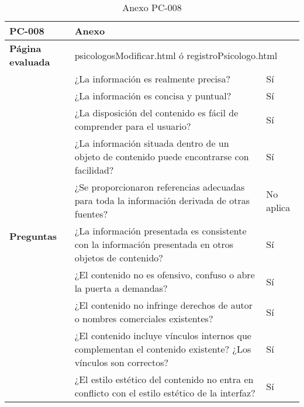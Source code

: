 \begin{table}[htpb]
\centering
\begin{tabularx}{\textwidth}{|l|X|l|}
\hline
\textbf{PC-008}                       & \multicolumn{2}{l|}{Anexo}                                                                                                \\ \hline
\textbf{Página evaluada}             & \multicolumn{2}{l|}{psicologosModificar.html ó registroPsicologo.html}                                    \\ \hline
\multirow{10}{*}{\textbf{Preguntas}} & ¿La información es realmente precisa?                                                                         & Sí        \\ \cline{2-3} 
                                     & ¿La información es concisa y puntual?                                                                         & Sí        \\ \cline{2-3} 
                                     & ¿La disposición del contenido es fácil de comprender para el usuario?                                         & Sí        \\ \cline{2-3} 
                                     & ¿La información situada dentro de un objeto de contenido puede encontrarse con facilidad?                     & Sí        \\ \cline{2-3} 
                                     & ¿Se proporcionaron referencias adecuadas para toda la información derivada de otras fuentes?                  & No aplica \\ \cline{2-3} 
                                     & ¿La información presentada es consistente con la información presentada en otros objetos de contenido?        & Sí        \\ \cline{2-3} 
                                     & ¿El contenido no es ofensivo, confuso o abre la puerta a demandas?                                            & Sí        \\ \cline{2-3} 
                                     & ¿El contenido no infringe derechos de autor o nombres comerciales existentes?                                 & Sí        \\ \cline{2-3} 
                                     & ¿El contenido incluye vínculos internos que complementan el contenido existente? ¿Los vínculos son correctos? & Sí        \\ \cline{2-3} 
                                     & ¿El estilo estético del contenido no entra en conflicto con el estilo estético de la interfaz?                & Sí        \\ \hline
\end{tabularx}
\caption{Anexo PC-008}
\end{table}


